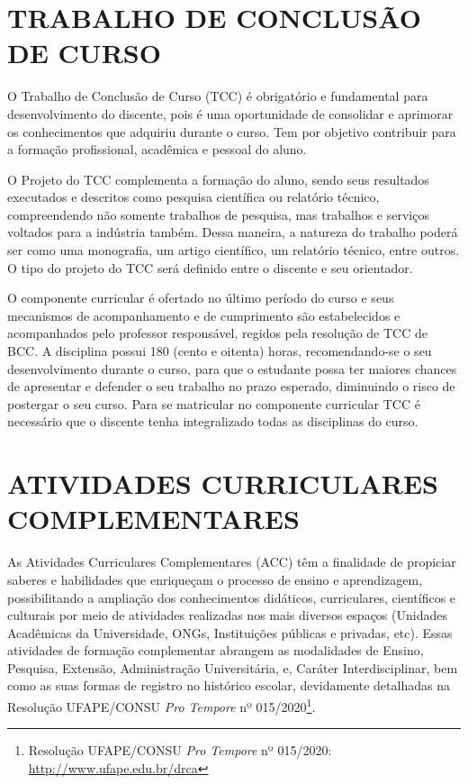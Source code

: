 \documentclass[
	12pt,				%
	openright,			%
  oneside,     %
	a4paper,			%
	chapter=TITLE,		%
	english,			%
	french,				%
	spanish,			%
	brazil				%
	]{abntex2}
\begin{document}
\chapter{TRABALHO DE CONCLUSÃO DE CURSO}

O Trabalho de Conclusão de Curso (TCC) é obrigatório e fundamental para desenvolvimento do discente, pois é uma oportunidade de consolidar e aprimorar os conhecimentos que adquiriu durante o curso. Tem por objetivo contribuir para a formação profissional, acadêmica e pessoal do aluno.

O Projeto do TCC complementa a formação do aluno, sendo seus resultados executados e descritos como pesquisa científica ou relatório técnico, compreendendo não somente trabalhos de pesquisa, mas trabalhos e serviços voltados para a indústria também.  Dessa maneira, a natureza do trabalho poderá ser como uma monografia, um artigo científico, um relatório técnico, entre outros. O tipo do projeto do TCC será definido entre o discente e seu orientador.

O componente curricular é ofertado no último período do curso e seus mecanismos de acompanhamento e de cumprimento são estabelecidos e acompanhados pelo professor responsável, regidos pela resolução de TCC de BCC. A disciplina possui 180 (cento e oitenta) horas, recomendando-se o seu desenvolvimento durante o curso, para que o estudante possa ter maiores chances de apresentar e defender o seu trabalho no prazo esperado, diminuindo o risco de postergar o seu curso. Para se matricular no componente curricular TCC é necessário que o discente tenha integralizado todas as disciplinas do curso.






%
%




\chapter{ATIVIDADES CURRICULARES COMPLEMENTARES}

As Atividades Curriculares Complementares (ACC) têm a finalidade de propiciar saberes e habilidades que enriqueçam o processo de ensino e aprendizagem, possibilitando a ampliação dos conhecimentos didáticos, curriculares, científicos e culturais por meio de atividades realizadas nos mais diversos espaços (Unidades Acadêmicas da Universidade, ONGs, Instituições públicas e privadas, etc). Essas atividades de formação complementar abrangem as modalidades de Ensino, Pesquisa, Extensão, Administração Universitária, e, Caráter Interdisciplinar, bem como as suas formas de registro no histórico escolar, devidamente detalhadas na Resolução UFAPE/CONSU \textit{Pro Tempore} nº 015/2020\footnote{Resolução UFAPE/CONSU \textit{Pro Tempore} nº 015/2020: \url{http://www.ufape.edu.br/drca}}. 
\end{document}
